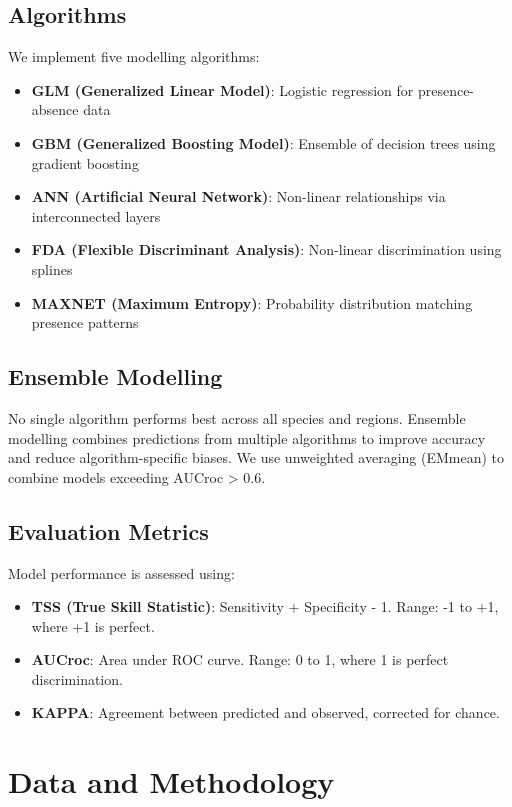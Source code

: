 \documentclass[12pt,a4paper]{report}
\begin{document}
\section{Algorithms}

We implement five modelling algorithms:

\begin{itemize}
    \item \textbf{GLM (Generalized Linear Model)}: Logistic regression for presence-absence data
    \item \textbf{GBM (Generalized Boosting Model)}: Ensemble of decision trees using gradient boosting
    \item \textbf{ANN (Artificial Neural Network)}: Non-linear relationships via interconnected layers
    \item \textbf{FDA (Flexible Discriminant Analysis)}: Non-linear discrimination using splines
    \item \textbf{MAXNET (Maximum Entropy)}: Probability distribution matching presence patterns
\end{itemize}

\section{Ensemble Modelling}

No single algorithm performs best across all species and regions. Ensemble modelling combines predictions from multiple algorithms to improve accuracy and reduce algorithm-specific biases. We use unweighted averaging (EMmean) to combine models exceeding AUCroc > 0.6.

\section{Evaluation Metrics}

Model performance is assessed using:
\begin{itemize}
    \item \textbf{TSS (True Skill Statistic)}: Sensitivity + Specificity - 1. Range: -1 to +1, where +1 is perfect.
    \item \textbf{AUCroc}: Area under ROC curve. Range: 0 to 1, where 1 is perfect discrimination.
    \item \textbf{KAPPA}: Agreement between predicted and observed, corrected for chance.
\end{itemize}

\chapter{Data and Methodology}
\end{document}
